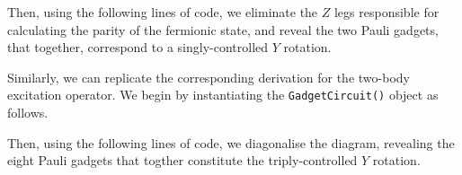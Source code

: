 
Then, using the following lines of code, we eliminate the $Z$ legs responsible for calculating the parity of the fermionic state, and reveal the two Pauli gadgets, that together, correspond to a singly-controlled $Y$ rotation.


Similarly, we can replicate the corresponding derivation for the two-body excitation operator. We begin by instantiating the \lstinline{GadgetCircuit()} object as follows.


Then, using the following lines of code, we diagonalise the diagram, revealing the eight Pauli gadgets that togther constitute the triply-controlled $Y$ rotation.


